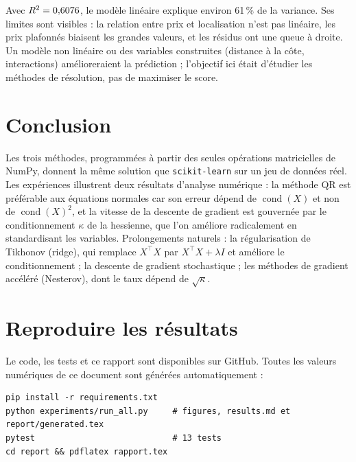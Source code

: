 \documentclass[11pt,a4paper]{article}
\theoremstyle{remark}
\DeclareMathOperator{\cond}{cond}
\begin{document}
Avec $R^2 = 0{,}6076$, le modèle linéaire explique environ 61\,\% de la variance. Ses limites sont visibles : la relation entre prix et localisation n'est pas linéaire, les prix plafonnés biaisent les grandes valeurs, et les résidus ont une queue à droite. Un modèle non linéaire ou des variables construites (distance à la côte, interactions) amélioreraient la prédiction ; l'objectif ici était d'étudier les méthodes de résolution, pas de maximiser le score.

\section{Conclusion}

Les trois méthodes, programmées à partir des seules opérations matricielles de NumPy, donnent la même solution que \texttt{scikit-learn} sur un jeu de données réel. Les expériences illustrent deux résultats d'analyse numérique : la méthode QR est préférable aux équations normales car son erreur dépend de $\cond(X)$ et non de $\cond(X)^2$, et la vitesse de la descente de gradient est gouvernée par le conditionnement $\kappa$ de la hessienne, que l'on améliore radicalement en standardisant les variables. Prolongements naturels : la régularisation de Tikhonov (ridge), qui remplace $X^\top X$ par $X^\top X + \lambda I$ et améliore le conditionnement ; la descente de gradient stochastique ; les méthodes de gradient accéléré (Nesterov), dont le taux dépend de $\sqrt\kappa$.

\appendix
\section{Reproduire les résultats}

Le code, les tests et ce rapport sont disponibles sur GitHub. Toutes les valeurs numériques de ce document sont générées automatiquement :
\begin{verbatim}
pip install -r requirements.txt
python experiments/run_all.py     # figures, results.md et report/generated.tex
pytest                            # 13 tests
cd report && pdflatex rapport.tex
\end{verbatim}
\end{document}
